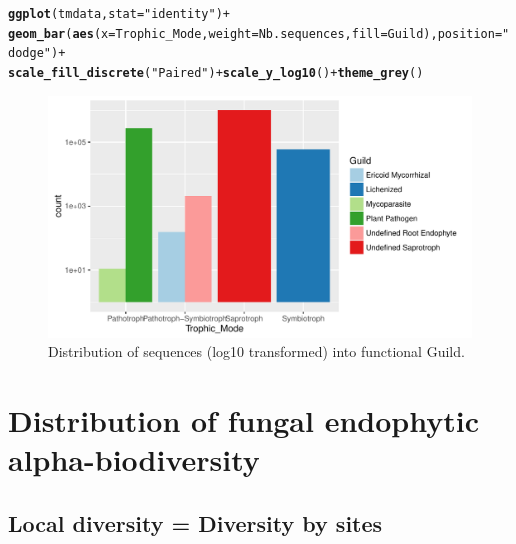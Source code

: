\documentclass[12pt]{article}\usepackage[]{graphicx}\usepackage[]{color}
\makeatletter
\def\maxwidth{ %
  \ifdim\Gin@nat@width>\linewidth
    \linewidth
  \else
    \Gin@nat@width
  \fi
}
\newcommand{\hlstr}[1]{\textcolor[rgb]{0.192,0.494,0.8}{#1}}%
\newcommand{\hlopt}[1]{\textcolor[rgb]{0,0,0}{#1}}%
\newcommand{\hlstd}[1]{\textcolor[rgb]{0.345,0.345,0.345}{#1}}%
\newcommand{\hlkwc}[1]{\textcolor[rgb]{0.333,0.667,0.333}{#1}}%
\newcommand{\hlkwd}[1]{\textcolor[rgb]{0.737,0.353,0.396}{\textbf{#1}}}%
\newenvironment{kframe}{%
 \def\at@end@of@kframe{}%
 \ifinner\ifhmode%
  \def\at@end@of@kframe{\end{minipage}}%
  \begin{minipage}{\columnwidth}%
 \fi\fi%
 \def\FrameCommand##1{\hskip\@totalleftmargin \hskip-\fboxsep
 \colorbox{shadecolor}{##1}\hskip-\fboxsep
     \hskip-\linewidth \hskip-\@totalleftmargin \hskip\columnwidth}%
 \MakeFramed {\advance\hsize-\width
   \@totalleftmargin\z@ \linewidth\hsize
   \@setminipage}}%
 {\par\unskip\endMakeFramed%
 \at@end@of@kframe}
\newenvironment{knitrout}{}{} %
\numberwithin{figure}{section}
\makeatother
\begin{document}
\begin{knitrout}\small
{}\color{fgcolor}\begin{kframe}
\begin{alltt}
\hlkwd{ggplot}\hlstd{(tmdata,} \hlkwc{stat}\hlstd{=}\hlstr{"identity"}\hlstd{)} \hlopt{+}
  \hlkwd{geom_bar}\hlstd{(}\hlkwd{aes}\hlstd{(}\hlkwc{x}\hlstd{= Trophic_Mode,} \hlkwc{weight} \hlstd{= Nb.sequences,}  \hlkwc{fill}\hlstd{=Guild),} \hlkwc{position} \hlstd{=} \hlstr{"dodge"}\hlstd{)} \hlopt{+}
  \hlkwd{scale_fill_discrete}\hlstd{(}\hlstr{"Paired"}\hlstd{)} \hlopt{+} \hlkwd{scale_y_log10}\hlstd{()} \hlopt{+} \hlkwd{theme_grey}\hlstd{()}
\end{alltt}
\end{kframe}\begin{figure}

{\centering \includegraphics[width=\maxwidth]{figure/unnamed-chunk-34-1} 

}

\caption[Distribution of sequences (log10 transformed) into functional Guild]{Distribution of sequences (log10 transformed) into functional Guild.}\label{fig:unnamed-chunk-34}
\end{figure}


\end{knitrout}

\section{Distribution of fungal endophytic alpha-biodiversity}
  \subsection{Local diversity = Diversity by sites}
  
\end{document}
